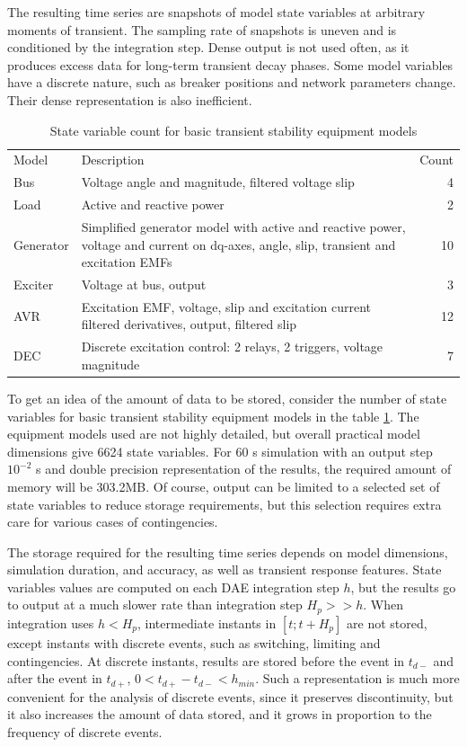 \documentclass[conference]{IEEEtran}
\begin{document}
The resulting time series are snapshots of model state variables at arbitrary moments of transient.
The sampling rate of snapshots is uneven and is conditioned by the integration step. Dense output is not used often, as it 
produces excess data for long-term transient decay phases. Some model variables have a discrete nature, such
as breaker positions and network parameters change. Their dense representation is also inefficient.

\begin{table}[!h]
	\caption{State variable count for basic transient stability equipment models\label{tab:statvarscount}}
	\centering
	\begin{tabularx}{\columnwidth}{l|X|r}
		\hline
		Model & Description & Count\\
		\hlineB{3}	
		Bus & Voltage angle and magnitude, filtered voltage slip & 4\\
		\hline
		Load & Active and reactive power & 2\\
		\hline
		Generator & Simplified generator model with active and reactive power, voltage and current on dq-axes, 
		angle, slip, transient and excitation EMFs & 10\\
		\hline
		Exciter & Voltage at bus, output & 3\\
		\hline
		AVR & Excitation EMF, voltage, slip and excitation current filtered derivatives, output, filtered slip & 12\\
		\hline
		DEC & Discrete excitation control: 2 relays, 2 triggers, voltage magnitude & 7\\
		\hline
	\end{tabularx}
\end{table}

To get an idea of the amount of data to be stored, consider the number of state variables for basic transient 
stability equipment models in the table \ref{tab:statvarscount}. The equipment models used are not 
highly detailed, but overall practical model dimensions give 6624 state variables. For 60 s simulation with an
output step \(10^{-2}\) s and double precision representation of the results, the required amount of memory will be 303.2MB.
Of course, output can be limited to a selected set of state variables to reduce storage requirements,
but this selection requires extra care for various cases of contingencies.

The storage required for the resulting time series depends on model dimensions, simulation duration,
and accuracy, as well as transient response features. State variables values are computed on each DAE integration
step \(h\), but the results go to output at a much slower rate than integration step \(H_p>>h\). 
When integration uses \(h<H_p\), intermediate instants in \([t;t+H_p]\) are not stored, except
instants with discrete events, such as switching, limiting and contingencies. At discrete instants,
results are stored before the event in \(t_{d-}\) and after the event in \(t_{d+}\), \(0<t_{d+}-t_{d-}<h_{min}\).
Such a representation is much more convenient for the analysis of discrete events, since it preserves
discontinuity, but it also increases the amount of data stored, and it grows in proportion to the 
frequency of discrete events.
\end{document}
